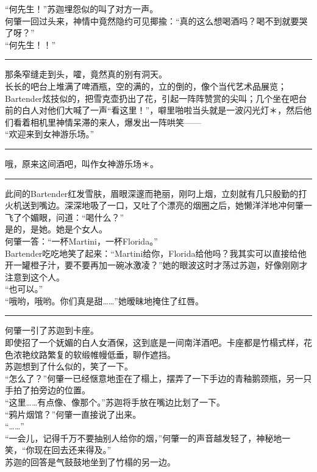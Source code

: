 \documentclass[oneside,11pt]{memoir} %
\begin{document}
\begin{CJK}{UTF8}{gbsn}
    “何先生！”苏迦埋怨似的叫了对方一声。\\\indent
    何肇一回过头来，神情中竟然隐约可见揶揄：“真的这么想喝酒吗？喝不到就要哭了呀？”\\\indent
    “何先生！！”\\\indent
\rule{-3pt}{30pt}
    那条窄缝走到头，嚯，竟然真的别有洞天。\\\indent
    长长的吧台上堆满了啤酒瓶，空的满的，立的倒的，像个当代艺术品展览；Bartender炫技似的，把雪克壶扔出了花，引起一阵阵赞赏的尖叫；几个坐在吧台前的白人对他们大喊了一声“看这里！”，噼里啪啦当头就是一波闪光灯＊，然后他们看着相机里神情呆滞的来人，爆发出一阵哄笑——\\\indent
    “欢迎来到女神游乐场。”\\\indent
\rule{-3pt}{30pt}
    哦，原来这间酒吧，叫作女神游乐场＊。\\\indent
\rule{-3pt}{30pt}
    此间的Bartender红发雪肤，眉眼深邃而艳丽，刚叼上烟，立刻就有几只殷勤的打火机送到嘴边。深深地吸了一口，又吐了个漂亮的烟圈之后，她懒洋洋地冲何肇一飞了个媚眼，问道：“喝什么？”\\\indent
    是的，是她。她是个女人。\\\indent
    何肇一答：“一杯Martini，一杯Florida。”\\\indent
    Bartender吃吃地笑了起来：“Martini给你，Florida给他吗？我其实可以直接给他开一罐橙子汁，要不要再加一碗冰激凌？”她的眼波这时才荡过苏迦，好像刚刚才注意到这个人。\\\indent
    “也可以。”\\\indent
    “哦哟，哦哟。你们真是甜……”她暧昧地掩住了红唇。\\\indent
\rule{-3pt}{30pt}
    何肇一引了苏迦到卡座。\\\indent
    即使招了一个妩媚的白人女酒保，这到底是一间南洋酒吧。卡座都是竹榻式样，花色浓艳纹路繁复的软缎帷幔低垂，聊作遮挡。\\\indent
    苏迦想到了什么似的，笑了一下。\\\indent
    “怎么了？”何肇一已经惬意地歪在了榻上，摆弄了一下手边的青釉鹅颈瓶，另一只手拍了拍旁边的位置。\\\indent
    “这里……有点像、像那个。”苏迦将手放在嘴边比划了一下。\\\indent
    “鸦片烟馆？”何肇一直接说了出来。\\\indent
    “……”\\\indent
    “一会儿，记得千万不要抽别人给你的烟，”何肇一的声音越发轻了，神秘地一笑，“你现在回去还来得及。”\\\indent
    苏迦的回答是气鼓鼓地坐到了竹榻的另一边。\\\indent

\end{CJK}
\end{document}
